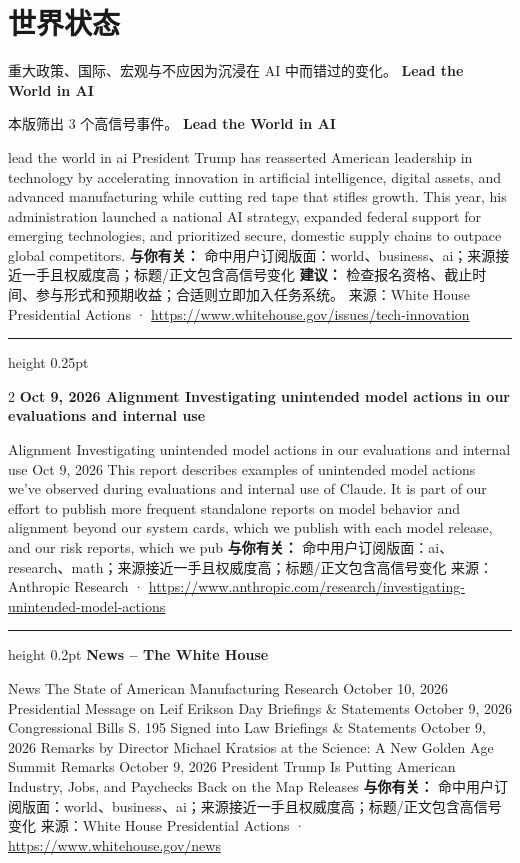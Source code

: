 \documentclass[10.5pt]{ctexart}
\begin{document}
\section*{世界状态}
{\color{ormuted} 重大政策、国际、宏观与不应因为沉浸在 AI 中而错过的变化。}
\vspace{2mm}
{\LARGE\bfseries Lead the World in AI}\par
\vspace{1mm}
{\color{ormuted} 本版筛出 3 个高信号事件。}
\vspace{3mm}
{\Large\bfseries Lead the World in AI}\par
lead the world in ai President Trump has reasserted American leadership in technology by accelerating innovation in artificial intelligence, digital assets, and advanced manufacturing while cutting red tape that stifles growth. This year, his administration launched a national AI strategy, expanded federal support for emerging technologies, and prioritized secure, domestic supply chains to outpace global competitors.
\textbf{与你有关：} 命中用户订阅版面：world、business、ai；来源接近一手且权威度高；标题/正文包含高信号变化
\textbf{建议：} 检查报名资格、截止时间、参与形式和预期收益；合适则立即加入任务系统。
{\footnotesize\color{ormuted} 来源：White House Presidential Actions · \url{https://www.whitehouse.gov/issues/tech-innovation}}
\vspace{4mm}
\hrule height 0.25pt
\vspace{3mm}
\begin{multicols}{2}
{\large\bfseries Oct 9, 2026 Alignment Investigating unintended model actions in our evaluations and internal use}\par
Alignment Investigating unintended model actions in our evaluations and internal use Oct 9, 2026 This report describes examples of unintended model actions we’ve observed during evaluations and internal use of Claude. It is part of our effort to publish more frequent standalone reports on model behavior and alignment beyond our system cards, which we publish with each model release, and our risk reports, which we pub
\textbf{与你有关：} 命中用户订阅版面：ai、research、math；来源接近一手且权威度高；标题/正文包含高信号变化
{\footnotesize\color{ormuted} 来源：Anthropic Research · \url{https://www.anthropic.com/research/investigating-unintended-model-actions}}
\vspace{2mm}
\hrule height 0.2pt
\vspace{2mm}
{\large\bfseries News – The White House}\par
News The State of American Manufacturing Research October 10, 2026 Presidential Message on Leif Erikson Day Briefings \& Statements October 9, 2026 Congressional Bills S. 195 Signed into Law Briefings \& Statements October 9, 2026 Remarks by Director Michael Kratsios at the Science: A New Golden Age Summit Remarks October 9, 2026 President Trump Is Putting American Industry, Jobs, and Paychecks Back on the Map Releases
\textbf{与你有关：} 命中用户订阅版面：world、business、ai；来源接近一手且权威度高；标题/正文包含高信号变化
{\footnotesize\color{ormuted} 来源：White House Presidential Actions · \url{https://www.whitehouse.gov/news}}
\end{multicols}
\end{document}
